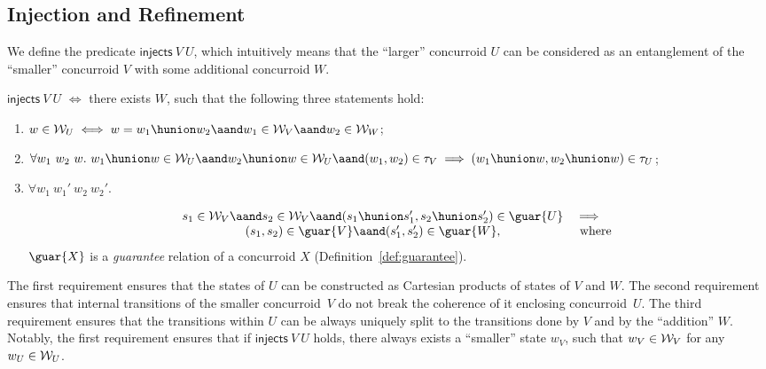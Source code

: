 \subsection{Injection and Refinement}
\label{sec:prop-inject-hiding}

We define the predicate $\mathsf{injects}~V~U$, which intuitively
means that the ``larger'' concurroid $U$ can be considered as an
entanglement of the ``smaller'' concurroid $V$ with some additional
concurroid $W$. 

\begin{definition}
\label{def:inj-pred}

$\mathsf{injects}~V~U$ $\iff$ there exists $W$, such that the
following three statements hold:

\begin{enumerate}

\item $w \in {\cal W}_U \iff w = w_1 \hunion w_2 \aand w_1 \in
  {\cal W}_V \aand w_2 \in  {\cal W}_W$;

\item $\forall w_1~w_2~w.~w_1 \hunion w \in {\cal W}_U \aand w_2
  \hunion w \in {\cal W}_U \aand (w_1, w_2) \in \tau_V \implies
  (w_1 \hunion w, w_2 \hunion w) \in \tau_U$;

\item $\forall w_1~w_1'~w_2~w_2'.$ 

\[
\begin{array}{cl}
s_1 \in {\cal W}_V \aand s_2 \in
  {\cal W}_V \aand (s_1 \hunion s_1', s_2 \hunion s_2') \in \guar{U} &
  \implies \\
  (s_1, s_2) \in \guar{V} \aand (s_1', s_2') \in \guar{W}, & \text{ where }
\end{array}
\]
%
$\guar{X}$ is a \emph{guarantee} relation of a concurroid $X$
(Definition~\ref{def:guarantee}).

\end{enumerate}

\end{definition}
The first requirement ensures that the states of $U$ can be
constructed as Cartesian products of states of $V$ and $W$. The second
requirement ensures that internal transitions of the smaller
concurroid~$V$ do not break the coherence of it enclosing
concurroid~$U$. The third requirement ensures that the transitions
within $U$ can be always uniquely split to the transitions done by $V$
and by the ``addition'' $W$.
%
Notably, the first requirement ensures that if $\mathsf{injects}~V~U$
holds, there always exists a ``smaller'' state $w_V$, such that $w_V
\in {\cal W}_V$ for any $w_U \in {\cal W}_U$.

